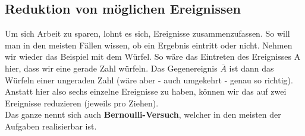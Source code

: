 	\subsection{Reduktion von möglichen Ereignissen}
		Um sich Arbeit zu sparen, lohnt es sich, Ereignisse zusammenzufassen. So will
		man in den meisten Fällen wissen, ob ein Ergebnis eintritt oder nicht.
		Nehmen wir wieder das Beispiel mit dem Würfel. So wäre das Eintreten des
		Ereignisses A hier, dass wir eine gerade Zahl würfeln. Das Gegenereignis
		\(\overline{A}\) ist dann das Würfeln einer ungeraden Zahl (wäre aber - auch
		umgekehrt - genau so richtig). Anstatt hier also sechs einzelne Ereignisse zu
		haben, können wir das auf zwei Ereignisse reduzieren (jeweils pro Ziehen).\\
		Das ganze nennt sich auch \textbf{Bernoulli-Versuch}, welcher in den meisten
		der Aufgaben realisierbar ist.
